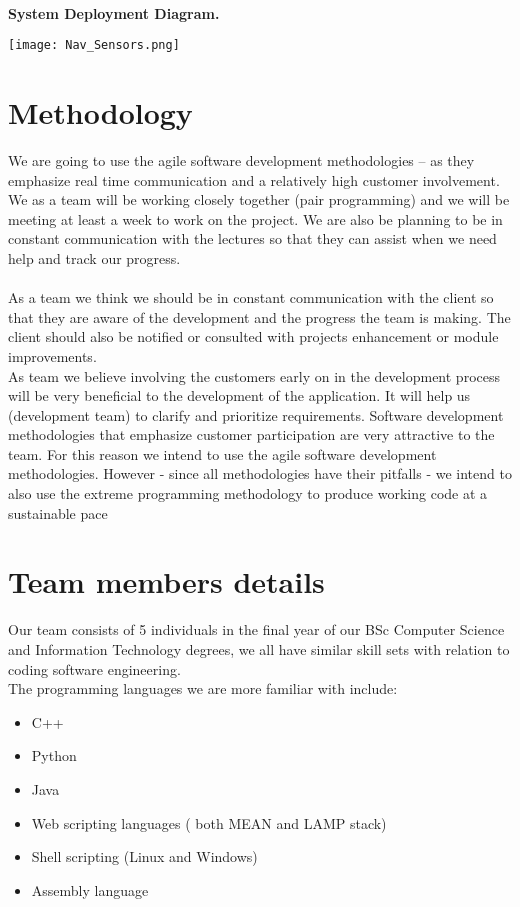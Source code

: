 \documentclass[runningheads,a4paper]{article}
\begin{document}
   \textbf{\\System Deployment Diagram.\\}
    \begin{center}
    
    
    \texttt{[image: Nav\_Sensors.png]}
    \end{center}
    
    
    
	\pagebreak
	\section{Methodology} 
	
	We are going to use the agile software development methodologies – as they emphasize real time communication and a relatively high customer involvement. We as a team will be working closely together (pair programming) and we will be meeting at least a week to work on the project.  We are also be planning to be in constant communication with the lectures so that they can assist when we need help and track our progress. \\
	\\As a team we think we should be in constant communication with the client so that they are aware of the development and the progress the team is making. The client should also be notified or consulted with projects enhancement or module improvements.\\
	
	As team we believe involving the customers early on in the development process will be very beneficial to the development of the application. It will help us (development team) to clarify and prioritize requirements. Software development methodologies that emphasize customer participation are very attractive to the team. For this reason we intend to use the agile software development methodologies. However - since all methodologies have their pitfalls - we intend to also use the extreme programming methodology to produce working code at a sustainable pace\\
    
	\section{Team members details}
	Our team consists of 5 individuals in the final year of our BSc Computer Science and Information Technology degrees, we all have similar skill sets with relation to coding software engineering. \\
	The programming languages we are more familiar with include: \\
	\begin{itemize}
      \item C++
      \item Python
      \item Java
      \item Web scripting languages ( both MEAN and LAMP stack)
      \item Shell scripting (Linux and Windows) 
      \item Assembly language\\
    \end{itemize}
     
\end{document}

